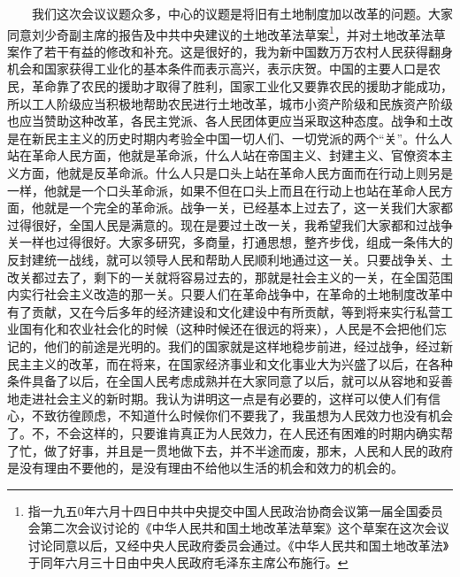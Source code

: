 \documentclass[cn,11pt,chinese]{elegantbook}
\begin{document}
　　我们这次会议议题众多，中心的议题是将旧有土地制度加以改革的问题。大家同意刘少奇副主席的报告及中共中央建议的土地改革法草案\footnote[2]{ 指一九五0年六月十四日中共中央提交中国人民政治协商会议第一届全国委员会第二次会议讨论的《中华人民共和国土地改革法草案》这个草案在这次会议讨论同意以后，又经中央人民政府委员会通过。《中华人民共和国土地改革法》于同年六月三十日由中央人民政府毛泽东主席公布施行。}，并对土地改革法草案作了若干有益的修改和补充。这是很好的，我为新中国数万万农村人民获得翻身机会和国家获得工业化的基本条件而表示高兴，表示庆贺。中国的主要人口是农民，革命靠了农民的援助才取得了胜利，国家工业化又要靠农民的援助才能成功，所以工人阶级应当积极地帮助农民进行土地改革，城市小资产阶级和民族资产阶级也应当赞助这种改革，各民主党派、各人民团体更应当采取这种态度。战争和土改是在新民主主义的历史时期内考验全中国一切人们、一切党派的两个“关”。什么人站在革命人民方面，他就是革命派，什么人站在帝国主义、封建主义、官僚资本主义方面，他就是反革命派。什么人只是口头上站在革命人民方面而在行动上则另是一样，他就是一个口头革命派，如果不但在口头上而且在行动上也站在革命人民方面，他就是一个完全的革命派。战争一关，已经基本上过去了，这一关我们大家都过得很好，全国人民是满意的。现在是要过土改一关，我希望我们大家都和过战争关一样也过得很好。大家多研究，多商量，打通思想，整齐步伐，组成一条伟大的反封建统一战线，就可以领导人民和帮助人民顺利地通过这一关。只要战争关、土改关都过去了，剩下的一关就将容易过去的，那就是社会主义的一关，在全国范围内实行社会主义改造的那一关。只要人们在革命战争中，在革命的土地制度改革中有了贡献，又在今后多年的经济建设和文化建设中有所贡献，等到将来实行私营工业国有化和农业社会化的时候（这种时候还在很远的将来），人民是不会把他们忘记的，他们的前途是光明的。我们的国家就是这样地稳步前进，经过战争，经过新民主主义的改革，而在将来，在国家经济事业和文化事业大为兴盛了以后，在各种条件具备了以后，在全国人民考虑成熟并在大家同意了以后，就可以从容地和妥善地走进社会主义的新时期。我认为讲明这一点是有必要的，这样可以使人们有信心，不致彷徨顾虑，不知道什么时候你们不要我了，我虽想为人民效力也没有机会了。不，不会这样的，只要谁肯真正为人民效力，在人民还有困难的时期内确实帮了忙，做了好事，并且是一贯地做下去，并不半途而废，那末，人民和人民的政府是没有理由不要他的，是没有理由不给他以生活的机会和效力的机会的。\\
\end{document}

